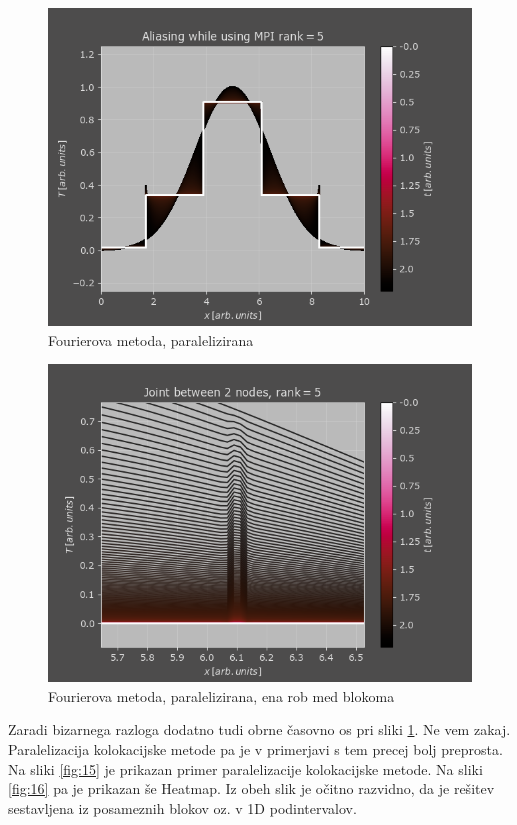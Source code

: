 \documentclass[a4paper]{article}
\begin{document}
\begin{figure}[H]
    \centering
        \includegraphics[width=\linewidth]{./images/MPI_alias.png}
        \caption{Fourierova metoda, paralelizirana}
\label{fig:13}
\end{figure}

\begin{figure}[H]
    \centering
        \includegraphics[width=\linewidth]{./images/MPI_Joint.png}
        \caption{Fourierova metoda, paralelizirana, ena rob med blokoma}
\label{fig:14}
\end{figure}

Zaradi bizarnega razloga dodatno tudi obrne časovno os pri sliki \ref{fig:13}. Ne vem zakaj. Paralelizacija 
kolokacijske metode pa je v primerjavi s tem precej bolj preprosta. Na sliki \ref{fig:15} je prikazan primer
paralelizacije kolokacijske metode. Na sliki \ref{fig:16} pa je prikazan še Heatmap. Iz obeh slik je očitno
razvidno, da je rešitev sestavljena iz posameznih blokov oz. v 1D podintervalov.
\end{document}
